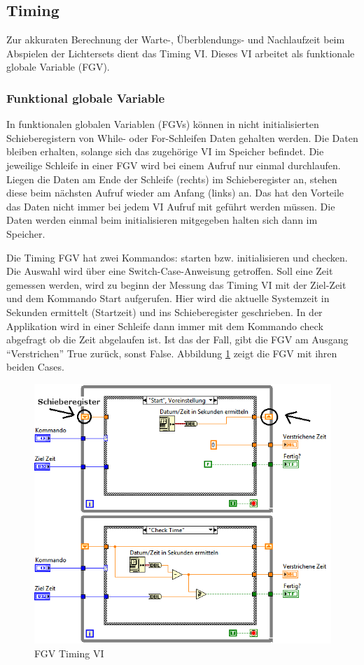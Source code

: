 	
\subsection{Timing}
Zur akkuraten Berechnung der Warte-, Überblendungs- und Nachlaufzeit beim Abspielen der Lichtersets dient das Timing VI. Dieses VI arbeitet als funktionale globale Variable (FGV).

\subsubsection{Funktional globale Variable}
In funktionalen globalen Variablen (FGVs) können in nicht initialisierten Schieberegistern von While- oder For-Schleifen Daten gehalten werden. 
Die Daten bleiben erhalten, solange sich das zugehörige VI im Speicher befindet. Die jeweilige Schleife in einer FGV wird bei einem Aufruf nur einmal durchlaufen. Liegen die Daten am Ende der Schleife (rechts) im Schieberegister an, stehen diese beim nächsten Aufruf wieder am Anfang (links) an. Das hat den Vorteile das Daten nicht immer bei jedem VI Aufruf mit geführt werden müssen. Die Daten werden einmal beim initialisieren mitgegeben halten sich dann im Speicher. \cite{LabViewHilfe}

Die Timing FGV hat zwei Kommandos: starten bzw. initialisieren und checken. Die Auswahl wird über eine Switch-Case-Anweisung getroffen. Soll eine Zeit gemessen werden, wird zu beginn der Messung das Timing VI mit der Ziel-Zeit und dem Kommando Start aufgerufen. Hier wird die aktuelle Systemzeit in Sekunden ermittelt (Startzeit) und ins Schieberegister geschrieben. In der Applikation wird in einer Schleife dann immer mit dem Kommando check abgefragt ob die Zeit abgelaufen ist. Ist das der Fall, gibt die FGV am Ausgang "`Verstrichen"' True zurück, sonst False. Abbildung \ref{fig:timing} zeigt die FGV mit ihren beiden Cases. 

	\begin{figure}[h!]
	\centering
		\includegraphics[width=\textwidth]{Pics/timing.png}
	\caption{FGV Timing VI}
	\label{fig:timing}
	\end{figure}


